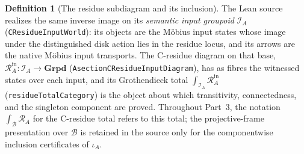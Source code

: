 \documentclass[11pt]{article}
\theoremstyle{plain}
\theoremstyle{definition}
\newtheorem{definition}[theorem]{Definition}
\theoremstyle{remark}
\begin{document}
\begin{definition}[The residue subdiagram and its inclusion]
The Lean source realizes the same inverse image on its \emph{semantic input groupoid}
$\mathcal I_A$ \textup{(}\texttt{CResidueInputWorld}\textup{)}: its objects are the M\"obius
input states whose image under the distinguished disk action lies in the residue locus, and its
arrows are the native M\"obius input transports. The C-residue diagram on that base,
$\mathcal R_A^{\mathrm{in}}:\mathcal I_A\to\mathbf{Grpd}$
\textup{(}\texttt{AsectionCResidueInputDiagram}\textup{)}, has as fibres the witnessed states over
each input, and its Grothendieck total $\int_{\mathcal I_A}\mathcal R_A^{\mathrm{in}}$
\textup{(}\texttt{residueTotalCategory}\textup{)} is the object about which transitivity,
connectedness, and the singleton component are proved. Throughout Part~3, the notation
$\int_{\mathcal B}\mathcal R_A$ for the C-residue total refers to this total; the projective-frame
presentation over $\mathcal B$ is retained in the source only for the componentwise inclusion
certificates of $\iota_A$.
\end{definition}
\end{document}
